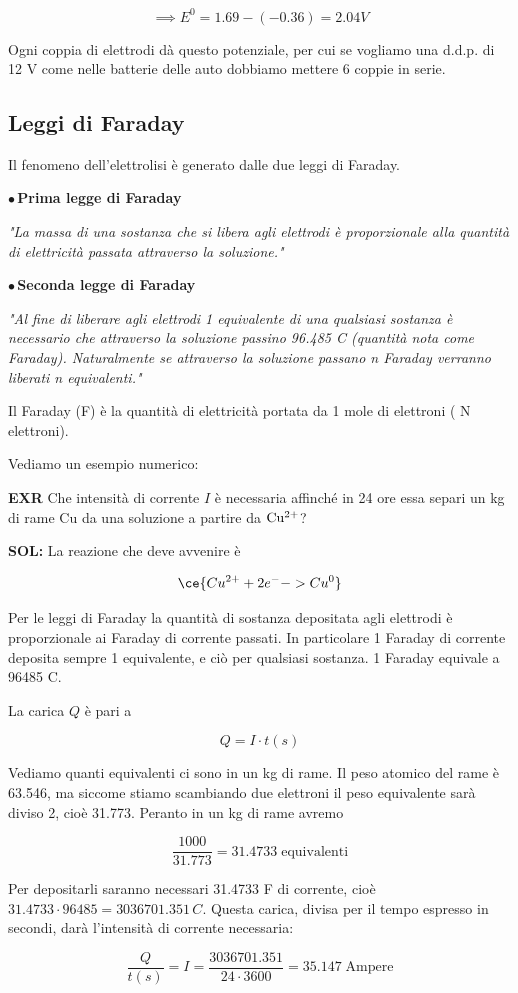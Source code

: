$$\implies E^0=1.69 - (-0.36)=2.04V$$

Ogni coppia di elettrodi dà questo potenziale, per cui se vogliamo una d.d.p. di 12 V come nelle batterie delle auto dobbiamo mettere 6 coppie in serie.
\subsection{Leggi di Faraday}
Il fenomeno dell'elettrolisi è generato dalle due leggi di Faraday.

\vspace{0.2cm}$\bullet$\,\textbf{Prima legge di Faraday}

\vspace{0.2cm}\textit{"La massa di una sostanza che si libera agli elettrodi è proporzionale alla quantità di elettricità passata attraverso la soluzione."}

\vspace{0.2cm}$\bullet$\,\textbf{Seconda legge di Faraday}

\vspace{0.2cm}\textit{"Al fine di liberare agli elettrodi 1 equivalente di una qualsiasi sostanza è necessario che attraverso la soluzione passino 96.485 C (quantità nota come Faraday). Naturalmente se attraverso la soluzione passano n Faraday verranno liberati n equivalenti."}

\vspace{0.2cm}Il Faraday (F) è la quantità di elettricità portata da 1 mole di elettroni ( N elettroni).

Vediamo un esempio numerico:

\vspace{0.2cm}\textbf{EXR} Che intensità di corrente $I$ è necessaria affinché in 24 ore essa separi un kg di rame Cu da una soluzione a partire da $\rm Cu^{2+}$?

\vspace{0.2cm}\textbf{SOL:} La reazione che deve avvenire è

$$\ce{Cu^{2+} + 2e^- -> Cu^0}$$

Per le leggi di Faraday la quantità di sostanza depositata agli elettrodi è proporzionale ai Faraday di corrente passati. In particolare 1 Faraday di corrente deposita sempre 1 equivalente, e ciò per qualsiasi sostanza. 1 Faraday equivale a 96485 C.

La carica $Q$ è pari a

$$Q=I \cdot t(s)$$

Vediamo quanti equivalenti ci sono in un kg di rame. Il peso atomico del rame è 63.546, ma siccome stiamo scambiando due elettroni il peso equivalente sarà diviso 2, cioè 31.773. Peranto in un kg di rame avremo

$$\frac{1000}{31.773} = 31.4733 \; \text{equivalenti}$$

Per depositarli saranno necessari 31.4733 F di corrente, cioè $31.4733 \cdot 96485 = 3036701.351 \, C$. Questa carica, divisa per il tempo espresso in secondi, darà l'intensità di corrente necessaria:

$$\frac{Q}{t(s)} = I = \frac{3036701.351}{24 \cdot 3600} = 35.147 \; \text{Ampere}$$